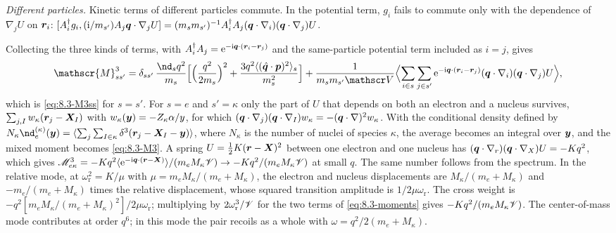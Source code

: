 \emph{Different particles.} Kinetic terms of different particles commute. In the potential term, $g_i$ fails to commute only with the dependence of $\nabla_jU$ on $\bm{r}_i$: $[A_i^\dagger g_i, (\mathrm{i}/m_{s'})A_j\bm{q}\cdot\nabla_jU] = (m_sm_{s'})^{-1}A_i^\dagger A_j(\bm{q}\cdot\nabla_i)(\bm{q}\cdot\nabla_j)U$.

Collecting the three kinds of terms, with $A_i^\dagger A_j = \mathrm{e}^{-\mathrm{i}\bm{q}\cdot(\bm{r}_i - \bm{r}_j)}$ and the same-particle potential term included as $i = j$, gives
\begin{equation}
  \mathscr{M}^3_{ss'} = \delta_{ss'}\,\frac{\nd_sq^2}{m_s}\Bigl[\Bigl(\frac{q^2}{2m_s}\Bigr)^2 + \frac{3q^2\langle(\hat{\vect{q}}\cdot\vect{p})^2\rangle_s}{m_s^2}\Bigr]
  + \frac{1}{m_sm_{s'}\Vol}\Bigl\langle\sum_{i\in s}\sum_{j\in s'}\ee^{-\ii\vect{q}\cdot(\vect{r}_i - \vect{r}_j)}(\vect{q}\cdot\nabla_i)(\vect{q}\cdot\nabla_j)U\Bigr\rangle ,
  \label{eq:D.26-M3}
\end{equation}
which is \cref{eq:8.3-M3ss} for $s = s'$. For $s = e$ and $s' = \kappa$ only the part of $U$ that depends on both an electron and a nucleus survives, $\sum_{j,I}w_\kappa(\bm{r}_j - \bm{X}_I)$ with $w_\kappa(\bm{y}) = -Z_\kappa\alpha/y$, for which $(\bm{q}\cdot\nabla_j)(\bm{q}\cdot\nabla_I)w_\kappa = -(\bm{q}\cdot\nabla)^2w_\kappa$. With the conditional density defined by $N_\kappa\nd_e^{(\kappa)}(\vect{y}) = \langle\sum_j\sum_{I\in\kappa}\delta^3(\vect{r}_j - \vect{X}_I - \vect{y})\rangle$, where $N_\kappa$ is the number of nuclei of species $\kappa$, the average becomes an integral over $\bm{y}$, and the mixed moment becomes \cref{eq:8.3-M3}. A spring $U = \frac12K(\bm{r} - \bm{X})^2$ between one electron and one nucleus has $(\bm{q}\cdot\nabla_r)(\bm{q}\cdot\nabla_X)U = -Kq^2$, which gives $\mathscr{M}^3_{e\kappa} = -Kq^2\langle\mathrm{e}^{-\mathrm{i}\bm{q}\cdot(\bm{r} - \bm{X})}\rangle/(m_eM_\kappa \mathscr{V}) \to -Kq^2/(m_eM_\kappa \mathscr{V})$ at small $q$. The same number follows from the spectrum. In the relative mode, at $\omega_{\mathrm{r}}^2 = K/\mu$ with $\mu = m_eM_\kappa/(m_e + M_\kappa)$, the electron and nucleus displacements are $M_\kappa/(m_e + M_\kappa)$ and $-m_e/(m_e + M_\kappa)$ times the relative displacement, whose squared transition amplitude is $1/2\mu\omega_{\mathrm{r}}$. The cross weight is $-q^2[m_eM_\kappa/(m_e + M_\kappa)^2]/2\mu\omega_{\mathrm{r}}$; multiplying by $2\omega_{\mathrm{r}}^3/\mathscr{V}$ for the two terms of \cref{eq:8.3-moments} gives $-Kq^2/(m_eM_\kappa \mathscr{V})$. The center-of-mass mode contributes at order $q^6$; in this mode the pair recoils as a whole with $\omega = q^2/2(m_e + M_\kappa)$.


